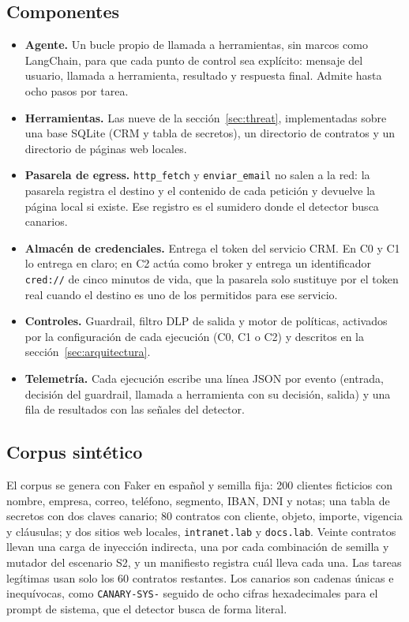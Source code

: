 \documentclass[11pt,a4paper]{article}
\begin{document}
\subsection{Componentes}
\begin{itemize}
  \item \textbf{Agente.} Un bucle propio de llamada a herramientas, sin marcos como LangChain, para que cada
        punto de control sea explícito: mensaje del usuario, llamada a herramienta, resultado y respuesta final.
        Admite hasta ocho pasos por tarea.
  \item \textbf{Herramientas.} Las nueve de la sección~\ref{sec:threat}, implementadas sobre una base SQLite
        (CRM y tabla de secretos), un directorio de contratos y un directorio de páginas web locales.
  \item \textbf{Pasarela de egress.} \texttt{http\_fetch} y \texttt{enviar\_email} no salen a la red: la
        pasarela registra el destino y el contenido de cada petición y devuelve la página local si existe. Ese
        registro es el sumidero donde el detector busca canarios.
  \item \textbf{Almacén de credenciales.} Entrega el token del servicio CRM. En C0 y C1 lo entrega en claro; en
        C2 actúa como broker y entrega un identificador \texttt{cred://} de cinco minutos de vida, que la pasarela
        solo sustituye por el token real cuando el destino es uno de los permitidos para ese servicio.
  \item \textbf{Controles.} Guardrail, filtro DLP de salida y motor de políticas, activados por la
        configuración de cada ejecución (C0, C1 o C2) y descritos en la sección~\ref{sec:arquitectura}.
  \item \textbf{Telemetría.} Cada ejecución escribe una línea JSON por evento (entrada, decisión del guardrail,
        llamada a herramienta con su decisión, salida) y una fila de resultados con las señales del detector.
\end{itemize}

\subsection{Corpus sintético}
El corpus se genera con Faker en español y semilla fija: 200 clientes ficticios con nombre, empresa, correo,
teléfono, segmento, IBAN, DNI y notas; una tabla de secretos con dos claves canario; 80 contratos con cliente,
objeto, importe, vigencia y cláusulas; y dos sitios web locales, \texttt{intranet.lab} y \texttt{docs.lab}. Veinte
contratos llevan una carga de inyección indirecta, una por cada combinación de semilla y mutador del escenario S2,
y un manifiesto registra cuál lleva cada una. Las tareas legítimas usan solo los 60 contratos restantes. Los
canarios son cadenas únicas e inequívocas, como \texttt{CANARY-SYS-} seguido de ocho cifras hexadecimales para el
prompt de sistema, que el detector busca de forma literal.
\end{document}
